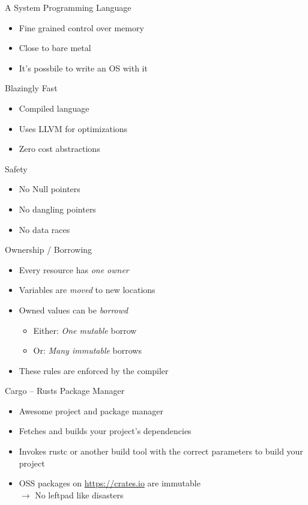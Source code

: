 \documentclass[aspectratio=1610,t]{beamer}
\begin{document}

\begin{frame}[c]{A System Programming Language}
  \begin{itemize}
    \item Fine grained control over memory
    \item Close to bare metal
    \item It's possbile to write an OS with it
  \end{itemize}
\end{frame}


\begin{frame}[c]{Blazingly Fast}
  \begin{itemize}
    \item Compiled language
    \item Uses LLVM for optimizations
    \item Zero cost abstractions
  \end{itemize}
\end{frame}


\begin{frame}[c]{Safety}
  \begin{itemize}
    \item No Null pointers
    \item No dangling pointers
    \item No data races
  \end{itemize}
\end{frame}


\begin{frame}[c]{Ownership / Borrowing}
  \begin{itemize}
    \item Every resource has \emph{one owner}
    \item Variables are \emph{moved} to new locations
    \item Owned values can be \emph{borrowd}
      \begin{itemize}
        \item{Either: \emph{One mutable} borrow}
        \item{Or: \emph{Many immutable} borrows}
      \end{itemize}
    \item These rules are enforced by the compiler
  \end{itemize}
\end{frame}

\begin{frame}[c]{Cargo -- Rusts Package Manager}
  \begin{itemize}
    \item Awesome project and package manager
    \item Fetches and builds your project’s dependencies
    \item Invokes rustc or another build tool with the correct parameters
      to build your project
    \item OSS packages on \url{https://crates.io} are immutable\\ $\rightarrow$
      No leftpad like disasters
  \end{itemize}
\end{frame}
\end{document}
